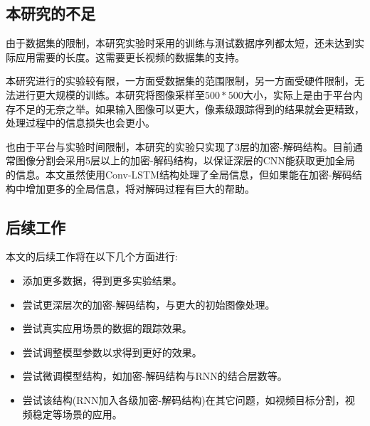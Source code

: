 \subsection{本研究的不足}
由于数据集的限制，本研究实验时采用的训练与测试数据序列都太短，还未达到实际应用需要的长度。这需要更长视频的数据集的支持。
\par
本研究进行的实验较有限，一方面受数据集的范围限制，另一方面受硬件限制，无法进行更大规模的训练。本研究将图像采样至$500*500$大小，实际上是由于平台内存不足的无奈之举。如果输入图像可以更大，像素级跟踪得到的结果就会更精致，处理过程中的信息损失也会更小。
\par
也由于平台与实验时间限制，本研究的实验只实现了3层的加密-解码结构。目前通常图像分割会采用5层以上的加密-解码结构，以保证深层的CNN能获取更加全局的信息。本文虽然使用Conv-LSTM结构处理了全局信息，但如果能在加密-解码结构中增加更多的全局信息，将对解码过程有巨大的帮助。
\subsection{后续工作}
本文的后续工作将在以下几个方面进行:
\begin{itemize}
    \item 添加更多数据，得到更多实验结果。
    \item 尝试更深层次的加密-解码结构，与更大的初始图像处理。
    \item 尝试真实应用场景的数据的跟踪效果。
    \item 尝试调整模型参数以求得到更好的效果。
    \item 尝试微调模型结构，如加密-解码结构与RNN的结合层数等。
    \item 尝试该结构(RNN加入各级加密-解码结构)在其它问题，如视频目标分割，视频稳定\supercite{benchme}等场景的应用。
\end{itemize}

